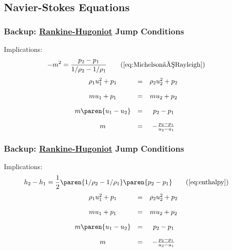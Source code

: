 %
%

\subsection{Navier-Stokes Equations}
%
\begin{frame}\frametitle{Backup: \href{https://en.wikipedia.org/wiki/Rankine\%E2\%80\%93Hugoniot_conditions}{Rankine-Hugoniot} Jump Conditions}
\center
	Implications:
\begin{equation}
	-m^{2} = \frac{p_{2} - p_{1}} { 1 / \rho_{2} - 1 / \rho_{1} }
\tag{\ref{eq:Michelson–Rayleigh}}
\end{equation}
\begin{equation*}
\begin{array}{ccc}
	\rho_{1} u_{1}^{2} + p_{1} & = & \rho_{2} u_{2}^{2} + p_{2} \\[10pt]
	m u_{1} + p_{1} & = & m u_{2} + p_{2} \\[10pt]
	m \paren{ u_{1} - u_{2} }& = & p_{2} - p_{1} \\[10pt]
	m & = & -\frac{p_{2} - p_{1}} {u_{2} - u_{1}}\\
\end{array}
\label{eq:Michelson–Rayleigh-derive}
\end{equation*}
\end{frame}
%
\begin{frame}\frametitle{Backup: \href{https://en.wikipedia.org/wiki/Rankine\%E2\%80\%93Hugoniot_conditions}{Rankine-Hugoniot} Jump Conditions}
\center
	Implications:
\begin{equation}
	h_{2} - h_{1} = \frac{1}{2} \displaystyle\paren{ 1 / \rho_{2} - 1 / \rho_{1} } \paren{p_{2} - p_{1}}
\tag{\ref{eq:enthalpy}}
\end{equation}
\begin{equation*}
\begin{array}{ccc}
	\rho_{1} u_{1}^{2} + p_{1} & = & \rho_{2} u_{2}^{2} + p_{2} \\[10pt]
	m u_{1} + p_{1} & = & m u_{2} + p_{2} \\[10pt]
	m \paren{ u_{1} - u_{2} }& = & p_{2} - p_{1} \\[10pt]
	m & = & -\frac{p_{2} - p_{1}} {u_{2} - u_{1}}\\
\end{array}
\label{eq:enthalpyh-derive}
\end{equation*}
\end{frame}

